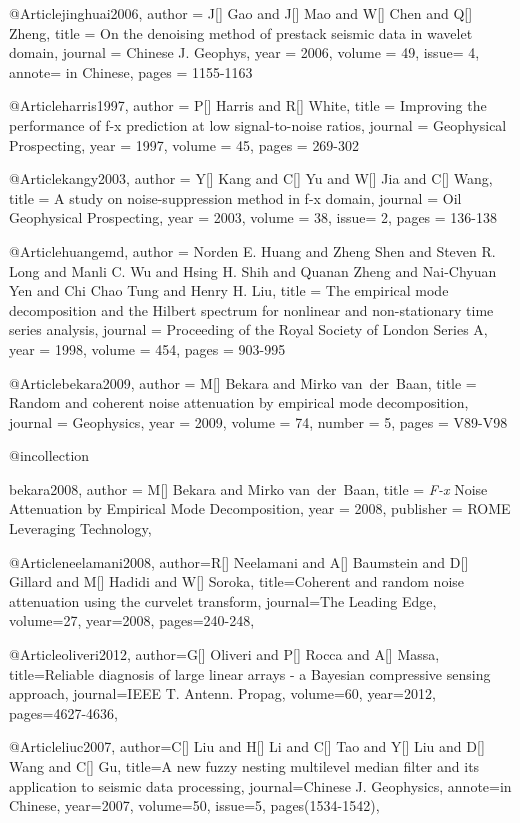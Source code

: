@Article{jinghuai2006,
  author = 	 {J[] Gao and J[] Mao and W[] Chen and Q[] Zheng},
  title = 	 {On the denoising method of prestack seismic data in wavelet domain},
  journal = 	 {Chinese J. Geophys},
  year = 	 2006,
  volume =	 49,
  issue= 	 4,
  annote=        {in Chinese},
  pages =	 {1155-1163}
}

@Article{harris1997,
  author = 	 {P[] Harris and R[] White},
  title = 	 {Improving the performance of f-x prediction at low signal-to-noise ratios},
  journal = 	 {Geophysical Prospecting},
  year = 	 1997,
  volume =	 45,
  pages =	 {269-302}
}


@Article{kangy2003,
  author = 	 {Y[] Kang and C[] Yu and W[] Jia and C[] Wang},
  title = 	 {A study on noise-suppression method in f-x domain},
  journal = 	 {Oil Geophysical Prospecting},
  year = 	 2003,
  volume =	 38,
  issue=        2,
  pages =	 {136-138}
}

@Article{huangemd,
  author = 	 {Norden E. Huang and Zheng Shen and Steven R. Long and Manli C. Wu and Hsing H. Shih and Quanan Zheng and Nai-Chyuan Yen and Chi Chao Tung and Henry H. Liu},
  title = 	 {The empirical mode decomposition and the {Hilbert} spectrum for nonlinear and non-stationary time series analysis},
  journal = 	 {Proceeding of the Royal Society of London Series A},
  year = 	 1998,
  volume = 	 454,
  pages = 	 {903-995}}

@Article{bekara2009,
  author = 	 {M[] Bekara and Mirko van~der~Baan},
  title = 	 {Random and coherent noise attenuation by empirical mode decomposition},
  journal = 	 {Geophysics},
  year = 	 2009,
  volume = 	 74,
  number = 	 5,
  pages = 	 {V89-V98}}

@incollection{bekara2008,
author = {M[] Bekara and Mirko van~der~Baan},
title = { \emph{F-x} Noise Attenuation by Empirical Mode Decomposition},
year = {2008},
publisher = {ROME Leveraging Technology},

}

@Article{neelamani2008,
author={R[] Neelamani and A[] Baumstein and D[] Gillard and M[] Hadidi and W[] Soroka},
title={Coherent and random noise attenuation using the curvelet transform},
journal={The Leading Edge},
volume=27,
year=2008,
pages={240-248},
}

@Article{oliveri2012,
author={G[] Oliveri and P[] Rocca and A[] Massa},
title={Reliable diagnosis of large linear arrays - a Bayesian compressive sensing approach},
journal={IEEE T. Antenn. Propag},
volume=60,
year=2012,
pages={4627-4636},
}


@Article{liuc2007,
author={C[] Liu and H[] Li and C[] Tao and Y[] Liu and D[] Wang and C[] Gu},
title={A new fuzzy nesting multilevel median filter and its application to seismic data processing},
journal={Chinese J. Geophysics},
annote={in Chinese},
year=2007,
volume=50,
issue=5,
pages(1534-1542),
}


